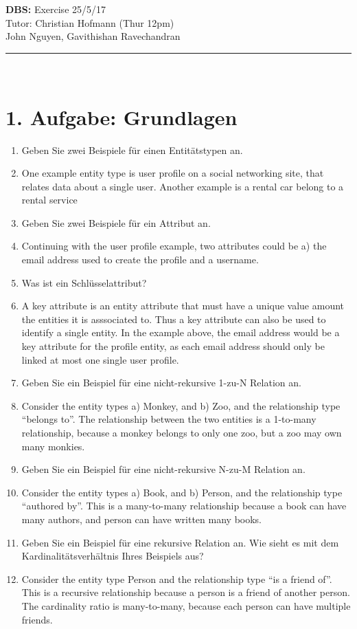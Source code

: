 \documentclass[12pt]{report}
\newcommand{\answer}{\textbf{A:}}
\newcommand{\TITLE}{\Large\textbf{DBS:} Exercise 2}
\newcommand{\AUTHOR}{\normalsize{John Nguyen, Gavithishan Ravechandran}}
\newcommand{\TUTOR}{\normalsize{Tutor: Christian Hofmann (Thur 12pm)}}
\begin{document}
\noindent\TITLE \hfill 5/5/17\\[3pt]
\TUTOR\\
\AUTHOR\\
\rule{\textwidth}{0.4pt}\\

\section*{1. Aufgabe: Grundlagen}

\begin{enumerate}
\item[(4 P)] Geben Sie zwei Beispiele für einen Entitätstypen an.
\item[\answer]
  One example entity type is user profile on a social networking site, that relates data about a single user. Another example is a rental car belong to a rental service

\item[(4 P)] Geben Sie zwei Beispiele für ein Attribut an.
\item[\answer]
  Continuing with the user profile example, two attributes could be a) the email address used to create the profile and a username.

\item[(4 P)] Was ist ein Schlüsselattribut?
\item[\answer]
  A key attribute is an entity attribute that must have a unique value amount the entities it is asssociated to. Thus a key attribute can also be used to identify a single entity. In the example above, the email address would be a key attribute for the profile entity, as each email address should only be linked at most one single user profile.

\item[(2 P)] Geben Sie ein Beispiel für eine nicht-rekursive 1-zu-N Relation an.
\item[\answer]
  Consider the entity types a) Monkey, and b) Zoo, and the relationship type ``belongs to''. The relationship between the two entities is a 1-to-many relationship, because a monkey belongs to only one zoo, but a zoo may own many monkies.

\item[(2 P)] Geben Sie ein Beispiel für eine nicht-rekursive N-zu-M Relation an.
\item[\answer]
  Consider the entity types a) Book, and b) Person, and the relationship type ``authored by''. This is a many-to-many relationship because a book can have many authors, and person can have written many books.

\item[(4 P)] Geben Sie ein Beispiel für eine rekursive Relation an. Wie sieht es mit dem Kardinalitätsverhältnis Ihres Beispiels aus?
\item[\answer]
  Consider the entity type Person and the relationship type ``is a friend of''. This is a recursive relationship because a person is a friend of another person. The cardinality ratio is many-to-many, because each person can have multiple friends.

\end{enumerate}
\end{document}
